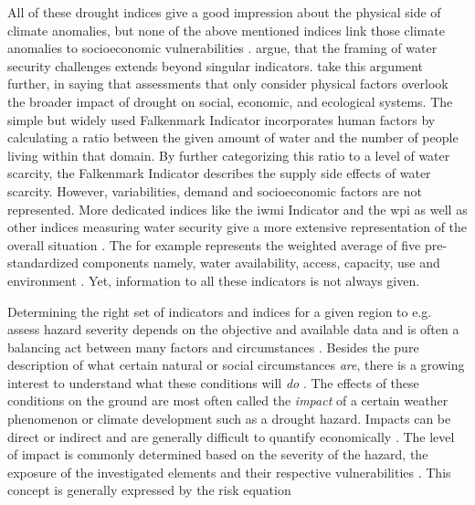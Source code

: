 All of these drought indices give a good impression about the physical side of climate anomalies, but none of the above mentioned indices link those climate anomalies to socioeconomic vulnerabilities \autocite{enenkelWhyPredictClimate2020}. \autocite{mishraWaterSecurityChanging2021} argue, that the framing of water security challenges extends beyond singular indicators. \autocite{lackstromBackyardHydroclimatologyCitizen2022} take this argument further, in saying that assessments that only consider physical factors overlook the broader impact of drought on social, economic, and ecological systems.\newline
The simple but widely used Falkenmark Indicator \autocite{falkenmarkMacroscaleWaterScarcity1989} incorporates human factors by calculating a ratio between the given amount of water and the number of people living within that domain. By further categorizing this ratio to a level of water scarcity, the Falkenmark Indicator describes the supply side effects of water scarcity. However, variabilities, demand and socioeconomic factors are not represented. More dedicated indices like the \acrfull{iwmi} Indicator and the \acrfull{wpi} as well as other indices measuring water security give a more extensive representation of the overall situation \autocite{arreguin-cortesMunicipalLevelWater2019,liuWaterScarcityAssessments2017}. The  for example represents the weighted average of five pre-standardized components namely, water availability, access, capacity, use and environment \autocite{sullivanWaterPovertyIndex2003}. Yet, information to all these indicators is not always given.

Determining the right set of indicators and indices for a given region to e.g. assess hazard severity depends on the objective and available data and is often a balancing act between many factors and circumstances \autocite{svobodaHandbookDroughtIndicators2016}. Besides the pure description of what certain natural or social circumstances \textit{are}, there is a growing interest to understand what these conditions will \textit{do} \autocite{boultDroughtImpactbasedForecasting2022, lackstromBackyardHydroclimatologyCitizen2022}.\newline
The effects of these conditions on the ground are most often called the \textit{impact} of a certain weather phenomenon or climate development such as a drought hazard. Impacts can be direct or indirect and are generally difficult to quantify economically \autocite{vereintenationenSpecialReportDrought2021}. The level of impact is commonly determined based on the severity of the hazard, the exposure of the investigated elements and their respective vulnerabilities \autocite{harrowsmithFutureForecastImpact2020,svobodaHandbookDroughtIndicators2016,vereintenationenSpecialReportDrought2021}.
This concept is generally expressed by the risk equation

